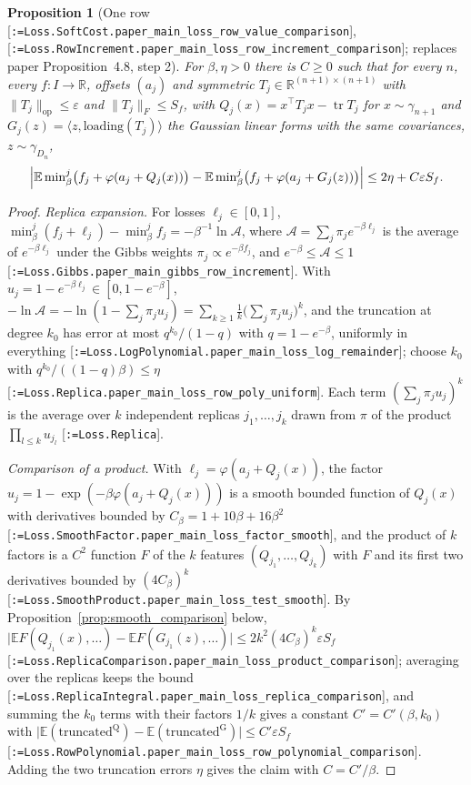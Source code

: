 \documentclass[11pt]{article}
\makeatletter
\newcommand{\formal@break}[1]{\@tfor\formal@tok:=#1\do{%
  \formal@tok
  \expandafter\ifx\formal@tok.\allowbreak\else
  \expandafter\ifx\formal@tok\_\allowbreak\fi\fi}}
\DeclareRobustCommand{\formal}[1]{\textnormal{[\texttt{\small\formal@break{#1}}]}}
\newcommand{\R}{\mathbb{R}}
\newcommand{\E}{\mathbb{E}}
\newcommand{\ip}[2]{\langle #1, #2\rangle}
\newcommand{\norm}[1]{\lVert #1\rVert}
\newcommand{\abs}[1]{\lvert #1\rvert}
\newcommand{\tr}{\operatorname{tr}}
\newcommand{\op}{\mathrm{op}}
\newcommand{\Fro}{F}
\newcommand{\gauss}{\gamma}
\newcommand{\Dd}{D}
\theoremstyle{plain}
\newtheorem{proposition}[theorem]{Proposition}
\theoremstyle{definition}
\makeatother
\begin{document}
\begin{proposition}[One row \formal{Loss.SoftCost.paper\_main\_loss\_row\_value\_comparison}, \formal{Loss.RowIncrement.paper\_main\_loss\_row\_increment\_comparison}; replaces paper Proposition~4.8, step 2]\label{prop:onerow}
For $\beta, \eta > 0$ there is $C \ge 0$ such that for every $n$, every
$f : I \to \R$, offsets $(a_j)$ and symmetric $T_j \in \R^{(n+1)\times(n+1)}$
with $\norm{T_j}_\op \le \varepsilon$ and $\norm{T_j}_\Fro \le S_f$, with
$Q_j(x) = x^{\top}T_jx - \tr T_j$ for $x \sim \gauss_{n+1}$ and
$G_j(z) = \ip{z}{\mathrm{loading}(T_j)}$ the Gaussian linear forms with the
same covariances, $z \sim \gauss_{\Dd_n}$,
\[
\Bigl|\E\min\nolimits_\beta^j\bigl(f_j + \varphi(a_j + Q_j(x))\bigr) - \E\min\nolimits_\beta^j\bigl(f_j + \varphi(a_j + G_j(z))\bigr)\Bigr| \le 2\eta + C\varepsilon S_f .
\]
\end{proposition}

\begin{proof}
\emph{Replica expansion.} For losses $\ell_j \in [0,1]$,
$\min_\beta^j(f_j + \ell_j) - \min_\beta^jf_j = -\beta^{-1}\ln\mathcal{A}$, where
$\mathcal{A} = \sum_j\pi_je^{-\beta\ell_j}$ is the average of $e^{-\beta\ell_j}$
under the Gibbs weights $\pi_j \propto e^{-\beta f_j}$, and
$e^{-\beta} \le \mathcal{A} \le 1$ \formal{Loss.Gibbs.paper\_main\_gibbs\_row\_increment}.
With $u_j = 1 - e^{-\beta\ell_j} \in [0, 1 - e^{-\beta}]$,
$-\ln\mathcal{A} = -\ln(1 - \sum_j\pi_ju_j) = \sum_{k\ge1}\frac1k\bigl(\sum_j\pi_ju_j\bigr)^k$,
and the truncation at degree $k_0$ has error at most
$q^{k_0}/(1 - q)$ with $q = 1 - e^{-\beta}$, uniformly in everything
\formal{Loss.LogPolynomial.paper\_main\_loss\_log\_remainder}; choose $k_0$
with $q^{k_0}/((1-q)\beta) \le \eta$ \formal{Loss.Replica.paper\_main\_loss\_row\_poly\_uniform}.
Each term $(\sum_j\pi_ju_j)^k$ is the average over $k$ independent replicas
$j_1, \dots, j_k$ drawn from $\pi$ of the product $\prod_{l\le k}u_{j_l}$
\formal{Loss.Replica}.

\emph{Comparison of a product.} With $\ell_j = \varphi(a_j + Q_j(x))$, the
factor $u_j = 1 - \exp(-\beta\varphi(a_j + Q_j(x)))$ is a smooth bounded
function of $Q_j(x)$ with derivatives bounded by $C_\beta = 1 + 10\beta + 16\beta^2$
\formal{Loss.SmoothFactor.paper\_main\_loss\_factor\_smooth}, and the
product of $k$ factors is a $C^2$ function $F$ of the $k$ features
$(Q_{j_1}, \dots, Q_{j_k})$ with $F$ and its first two derivatives bounded by
$(4C_\beta)^k$ \formal{Loss.SmoothProduct.paper\_main\_loss\_test\_smooth}.
By Proposition~\ref{prop:smooth_comparison} below,
$\abs{\E F(Q_{j_1}(x), \dots) - \E F(G_{j_1}(z), \dots)} \le 2k^2(4C_\beta)^k\varepsilon S_f$
\formal{Loss.ReplicaComparison.paper\_main\_loss\_product\_comparison};
averaging over the replicas keeps the bound
\formal{Loss.ReplicaIntegral.paper\_main\_loss\_replica\_comparison}, and
summing the $k_0$ terms with their factors $1/k$ gives a constant
$C' = C'(\beta, k_0)$ with
$\abs{\E(\text{truncated}^{\mathrm{Q}}) - \E(\text{truncated}^{\mathrm{G}})} \le C'\varepsilon S_f$
\formal{Loss.RowPolynomial.paper\_main\_loss\_row\_polynomial\_comparison}.
Adding the two truncation errors $\eta$ gives the claim with $C = C'/\beta$.
\end{proof}
\end{document}
